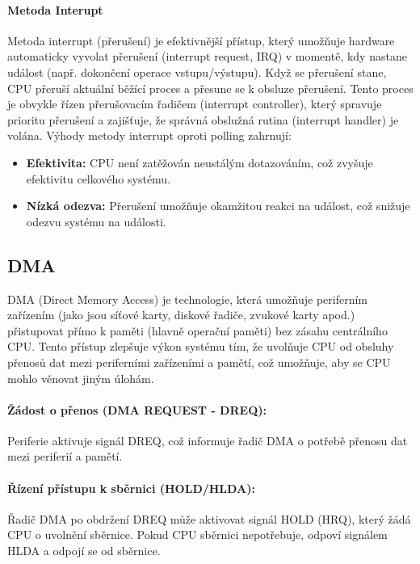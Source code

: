 \paragraph{Metoda Interupt}
Metoda interrupt (přerušení) je efektivnější přístup, který umožňuje hardware automaticky vyvolat přerušení (interrupt request, IRQ) v momentě, kdy nastane událost (např. dokončení operace vstupu/výstupu). Když se přerušení stane, CPU přeruší aktuální běžící proces a přesune se k obsluze přerušení. Tento proces je obvykle řízen přerušovacím řadičem (interrupt controller), který spravuje prioritu přerušení a zajišťuje, že správná obslužná rutina (interrupt handler) je volána. Výhody metody interrupt oproti polling zahrnují:
\begin{itemize}
    \item \textbf{Efektivita:} CPU není zatěžován neustálým dotazováním, což zvyšuje efektivitu celkového systému.
    \item \textbf{Nízká odezva:} Přerušení umožňuje okamžitou reakci na událost, což snižuje odezvu systému na události.
\end{itemize}
\subsection{DMA}
DMA (Direct Memory Access) je technologie, která umožňuje periferním zařízením (jako jsou síťové karty, diskové řadiče, zvukové karty apod.) přistupovat přímo k paměti (hlavně operační paměti) bez zásahu centrálního CPU. Tento přístup zlepšuje výkon systému tím, že uvolňuje CPU od obsluhy přenosů dat mezi periferními zařízeními a pamětí, což umožňuje, aby se CPU mohlo věnovat jiným úlohám.

\paragraph{Žádost o přenos (DMA REQUEST - DREQ):}
Periferie aktivuje signál DREQ, což informuje řadič DMA o potřebě přenosu dat mezi periferií a pamětí.

\paragraph{Řízení přístupu k sběrnici (HOLD/HLDA):}
Řadič DMA po obdržení DREQ může aktivovat signál HOLD (HRQ), který žádá CPU o uvolnění sběrnice. Pokud CPU sběrnici nepotřebuje, odpoví signálem HLDA a odpojí se od sběrnice.

